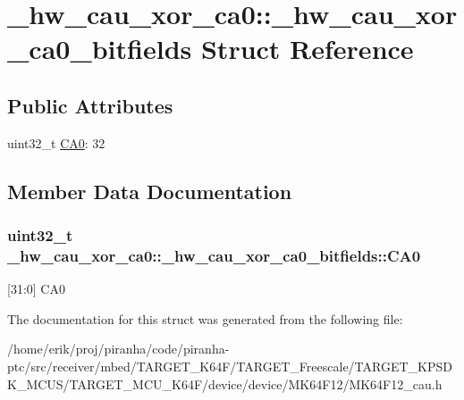 \hypertarget{struct__hw__cau__xor__ca0_1_1__hw__cau__xor__ca0__bitfields}{}\section{\+\_\+hw\+\_\+cau\+\_\+xor\+\_\+ca0\+:\+:\+\_\+hw\+\_\+cau\+\_\+xor\+\_\+ca0\+\_\+bitfields Struct Reference}
\label{struct__hw__cau__xor__ca0_1_1__hw__cau__xor__ca0__bitfields}
\subsection*{Public Attributes}
\begin{DoxyCompactItemize}
\item 
uint32\+\_\+t \hyperlink{struct__hw__cau__xor__ca0_1_1__hw__cau__xor__ca0__bitfields_abefa3cbc92450f09f03210e1e995832a}{C\+A0}\+: 32
\end{DoxyCompactItemize}


\subsection{Member Data Documentation}
\subsubsection[{\texorpdfstring{C\+A0}{CA0}}]{\setlength{\rightskip}{0pt plus 5cm}uint32\+\_\+t \+\_\+hw\+\_\+cau\+\_\+xor\+\_\+ca0\+::\+\_\+hw\+\_\+cau\+\_\+xor\+\_\+ca0\+\_\+bitfields\+::\+C\+A0}\hypertarget{struct__hw__cau__xor__ca0_1_1__hw__cau__xor__ca0__bitfields_abefa3cbc92450f09f03210e1e995832a}{}\label{struct__hw__cau__xor__ca0_1_1__hw__cau__xor__ca0__bitfields_abefa3cbc92450f09f03210e1e995832a}
\mbox{[}31\+:0\mbox{]} C\+A0 

The documentation for this struct was generated from the following file\+:\begin{DoxyCompactItemize}
\item 
/home/erik/proj/piranha/code/piranha-\/ptc/src/receiver/mbed/\+T\+A\+R\+G\+E\+T\+\_\+\+K64\+F/\+T\+A\+R\+G\+E\+T\+\_\+\+Freescale/\+T\+A\+R\+G\+E\+T\+\_\+\+K\+P\+S\+D\+K\+\_\+\+M\+C\+U\+S/\+T\+A\+R\+G\+E\+T\+\_\+\+M\+C\+U\+\_\+\+K64\+F/device/device/\+M\+K64\+F12/M\+K64\+F12\+\_\+cau.\+h\end{DoxyCompactItemize}
